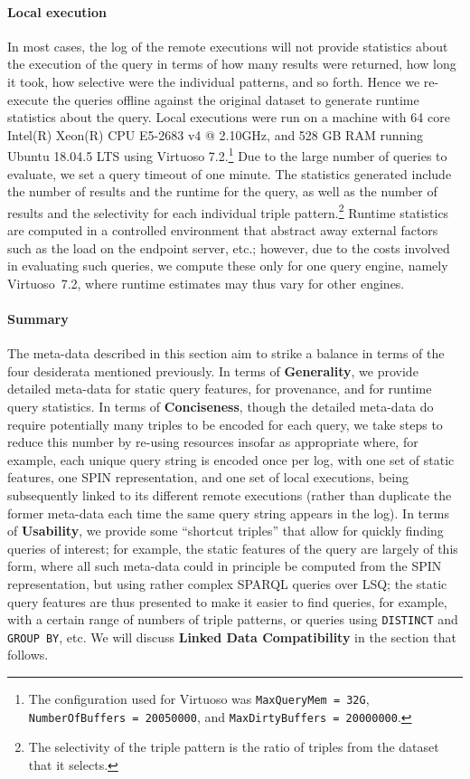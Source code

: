 \paragraph{Local execution} In most cases, the log of the remote executions will not provide statistics about the execution of the query in terms of how many results were returned, how long it took, how selective were the individual patterns, and so forth. Hence we re-execute the queries offline against the original dataset to generate runtime statistics about the query. Local executions were run on a machine with 64 core Intel(R) Xeon(R) CPU E5-2683 v4 @ 2.10GHz, and 528 GB RAM running Ubuntu 18.04.5 LTS using Virtuoso 7.2.\footnote{The configuration used for Virtuoso was \texttt{MaxQueryMem = 32G}, \texttt{NumberOfBuffers = 20050000}, and \texttt{MaxDirtyBuffers = 20000000}.} Due to the large number of queries to evaluate, we set a query timeout of one minute. The statistics generated include the number of results and the runtime for the query, as well as the number of results and the selectivity for each individual triple pattern.\footnote{The selectivity of the triple pattern is the ratio of triples from the dataset that it selects.} Runtime statistics are computed in a controlled environment that abstract away external factors such as the load on the endpoint server, etc.; however, due to the costs involved in evaluating such queries, we compute these only for one query engine, namely Virtuoso~7.2, where runtime estimates may thus vary for other engines.

\paragraph{Summary} The meta-data described in this section aim to strike a balance in terms of the four desiderata mentioned previously. In terms of \textbf{Generality}, we provide detailed meta-data for static query features, for provenance, and for runtime query statistics. In terms of \textbf{Conciseness}, though the detailed meta-data do require potentially many triples to be encoded for each query, we take steps to reduce this number by re-using resources insofar as appropriate where, for example, each unique query string is encoded once per log, with one set of static features, one SPIN representation, and one set of local executions, being subsequently linked to its different remote executions (rather than duplicate the former meta-data each time the same query string appears in the log). In terms of \textbf{Usability}, we provide some ``shortcut triples'' that allow for quickly finding queries of interest; for example, the static features of the query are largely of this form, where all such meta-data could in principle be computed from the SPIN representation, but using rather complex SPARQL queries over LSQ; the static query features are thus presented to make it easier to find queries, for example, with a certain range of numbers of triple patterns, or queries using \texttt{DISTINCT} and \texttt{GROUP BY}, etc. We will discuss \textbf{Linked Data Compatibility} in the section that follows.

